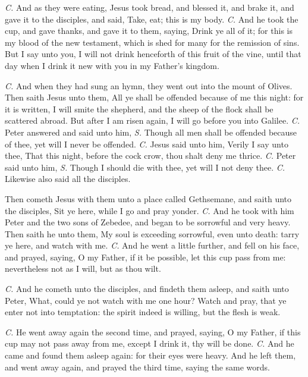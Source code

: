 \textit{C.} And as they were eating, Jesus took bread, and blessed it, and brake it, and gave it to the disciples, and said, {} Take, eat; this is my body. \textit{C.} And he took the cup, and gave thanks, and gave it to them, saying, {} Drink ye all of it; for this is my blood of the new testament, which is shed for many for the remission of sins. But I say unto you, I will not drink henceforth of this fruit of the vine, until that day when I drink it new with you in my Father’s kingdom.

\textit{C.} And when they had sung an hymn, they went out into the mount of Olives. Then saith Jesus unto them, {} All ye shall be offended because of me this night: for it is written, I will smite the shepherd, and the sheep of the flock shall be scattered abroad. But after I am risen again, I will go before you into Galilee. \textit{C.} Peter answered and said unto him, \textit{S.} Though all men shall be offended because of thee, yet will I never be offended. \textit{C.} Jesus said unto him, {} Verily I say unto thee, That this night, before the cock crow, thou shalt deny me thrice. \textit{C.} Peter said unto him, \textit{S.} Though I should die with thee, yet will I not deny thee. \textit{C.} Likewise also said all the disciples.

Then cometh Jesus with them unto a place called Gethsemane, and saith unto the disciples, {} Sit ye here, while I go and pray yonder. \textit{C.} And he took with him Peter and the two sons of Zebedee, and began to be sorrowful and very heavy. Then saith he unto them, {} My soul is exceeding sorrowful, even unto death: tarry ye here, and watch with me. \textit{C.} And he went a little further, and fell on his face, and prayed, saying, {} O my Father, if it be possible, let this cup pass from me: nevertheless not as I will, but as thou wilt.

\textit{C.} And he cometh unto the disciples, and findeth them asleep, and saith unto Peter, {} What, could ye not watch with me one hour? Watch and pray, that ye enter not into temptation: the spirit indeed is willing, but the flesh is weak.

\textit{C.} He went away again the second time, and prayed, saying, {} O my Father, if this cup may not pass away from me, except I drink it, thy will be done. \textit{C.} And he came and found them asleep again: for their eyes were heavy. And he left them, and went away again, and prayed the third time, saying the same words.

